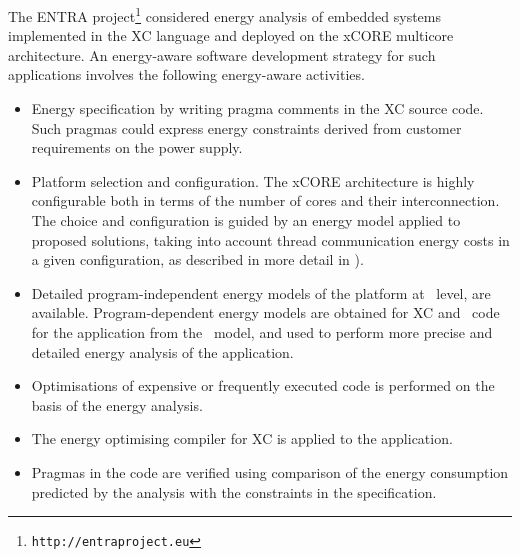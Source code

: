 \documentclass[oneside]{book}
\begin{document}
The ENTRA project\footnote{\texttt{http://entraproject.eu}} considered energy analysis of embedded systems implemented in the XC language and deployed on the xCORE multicore architecture.  An energy-aware software development strategy for such applications involves the following energy-aware activities.
\begin{itemize}
\item
Energy specification by writing pragma comments in the XC source code.  Such pragmas could express energy constraints derived from customer requirements on the power supply.
\item
Platform selection and configuration.  The xCORE architecture is highly configurable both in terms of the number of cores and their interconnection.  The choice and configuration is guided by an energy model applied to proposed solutions, taking into account thread communication energy costs in a given configuration, as described in more detail in \cite{KerrisonSwallow15}).
\item
Detailed program-independent energy models of the platform at \isa\ level, are available.  
Program-dependent energy models are obtained for XC and \llvmir\ code for the application from the \isa\ model, and used to perform more precise and detailed energy analysis of the application.
\item
Optimisations of expensive or frequently executed code is performed on the basis of the energy analysis.
\item
The energy optimising compiler for XC is applied to the application.
\item
Pragmas in the code are verified using comparison of the energy consumption predicted by the analysis with the constraints in the specification.  

\end{itemize}
\end{document}
